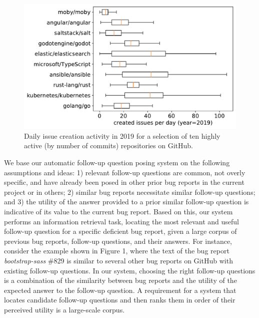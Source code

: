 \begin{figure}[t]
\centering
\includegraphics[width=0.95\linewidth]{figures/popular_repos.pdf}
\caption{Daily issue creation activity in 2019 for a selection of ten highly active
(by number of commits) repositories on GitHub.}
\label{fig:repo_activity}
\end{figure}

%
We base our automatic follow-up question posing system on the following assumptions and ideas: 1) relevant follow-up questions are common, not overly specific, and have already been posed in other prior bug reports in the current project or in others; 2) similar bug reports necessitate similar follow-up questions; and 3) the utility of the answer provided to a prior similar follow-up question is indicative of its value to the current bug report.
%
Based on this, our system performs an information retrieval task, locating the most relevant and useful follow-up question for a specific deficient bug report, given a large corpus of previous bug reports, follow-up questions, and their answers.
%
For instance, consider the example shown in Figure 1, where the text of the bug report {\em bootstrap-sass} \#829 is similar to several other bug reports on GitHub with existing follow-up questions.
%
In our system, choosing the right follow-up questions is a combination of the similarity between bug reports and the utility of the expected answer to the follow-up question.
%
A requirement for a system that locates candidate follow-up questions and then ranks them in order of their perceived utility is a large-scale corpus.


